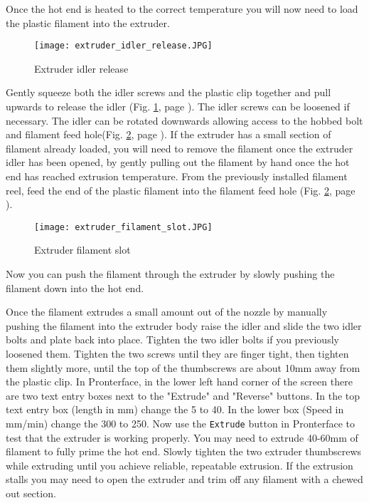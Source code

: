 Once the hot end is heated to the correct temperature you will now need to load the plastic filament into the extruder.
\begin{figure}[hbt]
\centering
\texttt{[image: extruder\_idler\_release.JPG]}
\caption{Extruder idler release}
\label{fig:extruder_idler_release}
\end{figure}
Gently squeeze both the idler screws and the plastic clip together and pull upwards to release the idler (Fig. \ref{fig:extruder_idler_release}, page \pageref{fig:extruder_idler_release}). The idler screws can be loosened if necessary. The idler can be rotated downwards allowing access to the hobbed bolt and filament feed hole(Fig. \ref{fig:extruder_filament_slot}, page \pageref{fig:extruder_filament_slot}). If the extruder has a small section of filament already loaded, you will need to remove the filament once the extruder idler has been opened, by gently pulling out the filament by hand once the hot end has reached extrusion temperature. From the previously installed filament reel, feed the end of the plastic filament into the filament feed hole
(Fig. \ref{fig:extruder_filament_slot}, page \pageref{fig:extruder_filament_slot}).
\begin{figure}[hbt]
\centering
\texttt{[image: extruder\_filament\_slot.JPG]}
\caption{Extruder filament slot}
\label{fig:extruder_filament_slot}
\end{figure}
Now you can push the filament through the extruder by slowly pushing the filament down into the hot end.

Once the filament extrudes a small amount out of the nozzle by manually pushing the filament into the extruder body raise the idler and slide the two idler bolts and plate back into place. Tighten the two idler bolts if you previously loosened them. Tighten the two screws until they are finger tight, then tighten them slightly more, until the top of the thumbscrews are about 10mm away from the plastic clip. In Pronterface, in the lower left hand corner of the screen there are two text entry boxes next to the "Extrude" and "Reverse" buttons. In the top text entry box (length in mm) change the 5 to 40. In the lower box (Speed in mm/min) change the 300 to 250. Now use the \texttt{Extrude} button in Pronterface to test that the extruder is working properly. You may need to extrude 40-60mm of filament to fully prime the hot end. Slowly tighten the two extruder thumbscrews while extruding until you achieve reliable, repeatable extrusion. If the extrusion stalls you may need to open the extruder and trim off any filament with a chewed out section.

